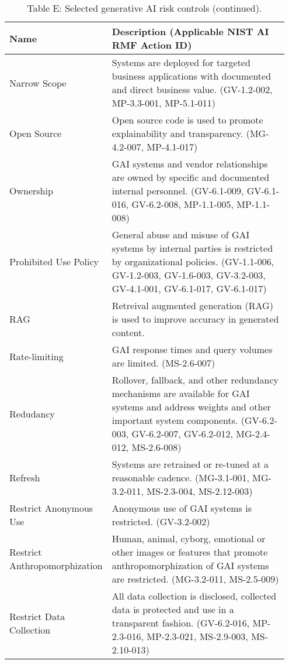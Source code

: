 \documentclass[fleqn]{article}
\begin{document}
\begin{table}[H]
	\caption*{Table E: Selected generative AI risk controls (continued).}
	\label{tab:controls_cont2}
	\footnotesize
	\begin{tabular}{|m{0.25\linewidth} |m{0.70\linewidth} |}
		\hline
		\textbf{Name} & \textbf{Description} (Applicable NIST AI RMF Action ID)\\
		\hline		
		Narrow Scope & Systems are deployed for targeted business applications with documented and direct business value. (GV-1.2-002, MP-3.3-001, MP-5.1-011) \\ \hline
		Open Source & Open source code is used to promote explainability and transparency. (MG-4.2-007, MP-4.1-017) \\ 
		\hline
		Ownership & GAI systems and vendor relationships are owned by specific and documented internal personnel. (GV-6.1-009, GV-6.1-016, GV-6.2-008, MP-1.1-005, MP-1.1-008) \\ \hline
		Prohibited Use Policy & General abuse and misuse of GAI systems by internal parties is restricted by organizational policies. (GV-1.1-006, GV-1.2-003, GV-1.6-003, GV-3.2-003, GV-4.1-001, GV-6.1-017, GV-6.1-017) \\ 
		\hline
		RAG & Retreival augmented generation (RAG) is used to improve accuracy in generated content.  \\ \hline
		Rate-limiting  & GAI response times and query volumes are limited. (MS-2.6-007) \\ 
		\hline
		Redudancy & Rollover, fallback, and other redundancy mechanisms are available for GAI systems and address weights and other important system components. (GV-6.2-003, GV-6.2-007, GV-6.2-012, MG-2.4-012, MS-2.6-008)   \\ 
		\hline
		Refresh & Systems are retrained or re-tuned at a reasonable cadence. (MG-3.1-001, MG-3.2-011, MS-2.3-004, MS-2.12-003)  \\ 
		\hline
		Restrict Anonymous Use & Anonymous use of GAI systems is restricted. (GV-3.2-002)  \\ 
		\hline
		Restrict Anthropomorphization  & Human, animal, cyborg, emotional or other images or features that promote anthropomorphization of GAI systems are restricted. (MG-3.2-011, MS-2.5-009)   \\ 
		\hline
		Restrict Data Collection & All data collection is disclosed, collected data is protected and use in a transparent fashion. (GV-6.2-016, MP-2.3-016, MP-2.3-021, MS-2.9-003,  MS-2.10-013) \\ 
		\hline		

\end{tabular}
\end{table}
\end{document}
